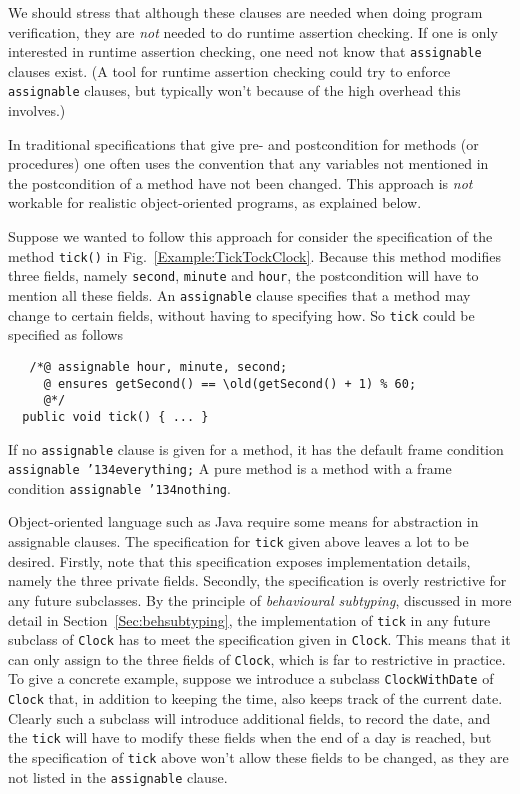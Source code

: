 \documentclass{llncs}
\def\old{\texttt{\char'134old}}
\def\everything{\texttt{\char'134everything}}
\def\nothing{\texttt{\char'134nothing}}
\begin{document}
We should stress that although these clauses are needed when doing
program verification, they are \emph{not} needed to do runtime assertion checking. 
If one is only interested in runtime assertion checking, one need not know 
that \texttt{assignable} clauses exist.
(A tool for runtime assertion checking could try to enforce \texttt{assignable} 
clauses, but typically won't because of the high overhead this involves.)

\smallskip

In traditional specifications that give pre- and postcondition for methods
(or procedures) one often uses the convention that any variables not mentioned 
in the postcondition of a method have not been changed.  This approach is 
\emph{not} workable for realistic object-oriented programs, as explained below.

Suppose we wanted to follow this approach for consider the specification 
of the method \texttt{tick()} in Fig.~\ref{Example:TickTockClock}.
Because this method modifies three fields, namely
\texttt{second}, \texttt{minute} and \texttt{hour}, 
the postcondition will have to mention all these fields.
An  \texttt{assignable} clause specifies that a method may change to certain 
fields, without having to specifying how.
So \texttt{tick} could be specified as follows
\begin{verbatim}
   /*@ assignable hour, minute, second;
     @ ensures getSecond() == \old(getSecond() + 1) % 60;
     @*/
  public void tick() { ... }
\end{verbatim}
If no \texttt{assignable} clause is given for a method, it has the
default frame condition \texttt{assignable \everything;}
A pure method is a method with a frame condition \texttt{assignable \nothing}.

Object-oriented language such as Java require some means for abstraction in 
assignable clauses.
The specification for \texttt{tick} given above leaves a lot to be desired.
Firstly, note that this specification exposes implementation details,
namely the three private fields.
Secondly, the specification is overly restrictive for any future subclasses.
By the principle of \emph{behavioural subtyping}, discussed in more detail
in Section~\ref{Sec:behsubtyping}, the implementation of \texttt{tick} in any future
subclass of \texttt{Clock} has to meet the specification given in \texttt{Clock}.
This means that it can only assign to the three fields of \texttt{Clock},
which is far to restrictive in practice.
To give a concrete example, suppose we introduce a subclass \texttt{ClockWithDate} 
of \texttt{Clock} that, in addition to keeping the time, also keeps track of the 
current date.  Clearly such a subclass will introduce additional fields, to record 
the date, and the \texttt{tick} will have to modify these fields when the end
of a day is reached,  but the specification of \texttt{tick} above won't allow 
these fields to be changed, as they are not listed in the \texttt{assignable} clause.
\end{document}
